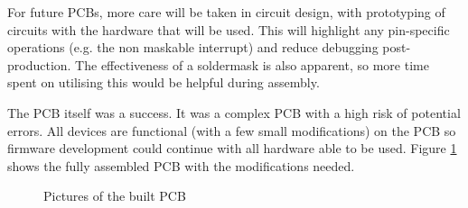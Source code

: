 For future PCBs, more care will be taken in circuit design, with prototyping of circuits with the hardware that will be used. This will highlight any pin-specific operations (e.g. the non maskable interrupt) and reduce debugging post-production. The effectiveness of a soldermask is also apparent, so more time spent on utilising this would be helpful during assembly.

The PCB itself was a success. It was a complex PCB with a high risk of potential errors. All devices are functional (with a few small modifications) on the PCB so firmware development could continue with all hardware able to be used. Figure \ref{fig:PCB:Built} shows the fully assembled PCB with the modifications needed.

\begin{figure}
\centering
{}
\caption{Pictures of the built PCB}
\label{fig:PCB:Built}
\end{figure}
